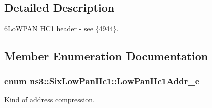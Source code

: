 \subsection{Detailed Description}
6\+Lo\+W\+P\+AN H\+C1 header -\/ see \{4944\}. 

\subsection{Member Enumeration Documentation}
\subsubsection[{\texorpdfstring{Low\+Pan\+Hc1\+Addr\+\_\+e}{LowPanHc1Addr_e}}]{\setlength{\rightskip}{0pt plus 5cm}enum {\bf ns3\+::\+Six\+Low\+Pan\+Hc1\+::\+Low\+Pan\+Hc1\+Addr\+\_\+e}}\hypertarget{classns3_1_1SixLowPanHc1_a29c864d9bf6bc466ee2214a95a83dcad}{}\label{classns3_1_1SixLowPanHc1_a29c864d9bf6bc466ee2214a95a83dcad}


Kind of address compression. 


